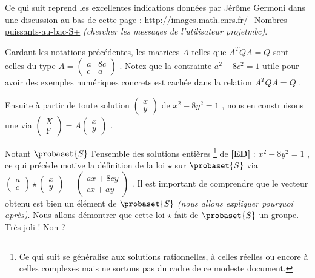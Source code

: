 Ce qui suit reprend les excellentes indications données par Jérôme Germoni dans une discussion au bas de cette page :
\url{http://images.math.cnrs.fr/+Nombres-puissants-au-bac-S+}
\textit{(chercher les messages de l'utilisateur projetmbc)}.


\bigskip

Gardant les notations précédentes, les matrices $A$ telles que $A^T Q A = Q$ sont celles du type 
$A
=
\begin{pmatrix} 
  a & 8c \\ 
  c & a
\end{pmatrix}$ .
Notez que la contrainte $a^2 - 8c^2 = 1$ utile pour avoir des exemples numériques concrets est cachée dans la relation $A^T Q A = Q$ .


\medskip

Ensuite à partir de toute solution 
$\begin{pmatrix} 
  x \\ 
  y 
\end{pmatrix}$
de $x^2 - 8 y^2 = 1$ , nous en construisons une  via
$\begin{pmatrix} 
  X \\ 
  Y 
\end{pmatrix}
=
A
\begin{pmatrix} 
  x \\ 
  y 
\end{pmatrix}$ .


\medskip

Notant $\probaset{S}$ l'ensemble des solutions entières
\footnote{
	Ce qui suit se généralise aux solutions rationnelles, à celles réelles ou encore à celles complexes mais ne sortons pas du cadre de ce modeste document.
}
de \textbf{[ED]} : $x^2 - 8 y^2 = 1$ , ce qui précède motive la définition de la loi $\star$ sur $\probaset{S}$ via
$\begin{pmatrix} 
  a \\ 
  c 
\end{pmatrix}
\star
\begin{pmatrix} 
  x \\ 
  y 
\end{pmatrix}
=
\begin{pmatrix} 
  a x + 8c y \\ 
  c x + a y
\end{pmatrix}$ .
Il est important de comprendre que le vecteur obtenu est bien un élément de $\probaset{S}$ \textit{(nous allons expliquer pourquoi après)}.
Nous allons démontrer que cette loi $\star$ fait de $\probaset{S}$ un groupe. Très joli ! Non ?


